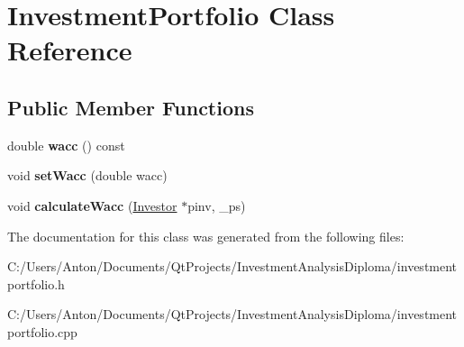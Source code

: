 \hypertarget{class_investment_portfolio}{}\section{Investment\+Portfolio Class Reference}
\label{class_investment_portfolio}
\subsection*{Public Member Functions}
\begin{DoxyCompactItemize}
\item 
\hypertarget{class_investment_portfolio_ad832e8ab900db22ccdeca5b158e132d5}{}double {\bfseries wacc} () const \label{class_investment_portfolio_ad832e8ab900db22ccdeca5b158e132d5}

\item 
\hypertarget{class_investment_portfolio_a8f53d05e5f56ff4553796c64fd018099}{}void {\bfseries set\+Wacc} (double wacc)\label{class_investment_portfolio_a8f53d05e5f56ff4553796c64fd018099}

\item 
\hypertarget{class_investment_portfolio_a4b54e700ac6773ea193ab5aed546cf1e}{}void {\bfseries calculate\+Wacc} (\hyperlink{class_investor}{Investor} $\ast$pinv, \+\_\+ps)\label{class_investment_portfolio_a4b54e700ac6773ea193ab5aed546cf1e}

\end{DoxyCompactItemize}


The documentation for this class was generated from the following files\+:\begin{DoxyCompactItemize}
\item 
C\+:/\+Users/\+Anton/\+Documents/\+Qt\+Projects/\+Investment\+Analysis\+Diploma/investmentportfolio.\+h\item 
C\+:/\+Users/\+Anton/\+Documents/\+Qt\+Projects/\+Investment\+Analysis\+Diploma/investmentportfolio.\+cpp\end{DoxyCompactItemize}
